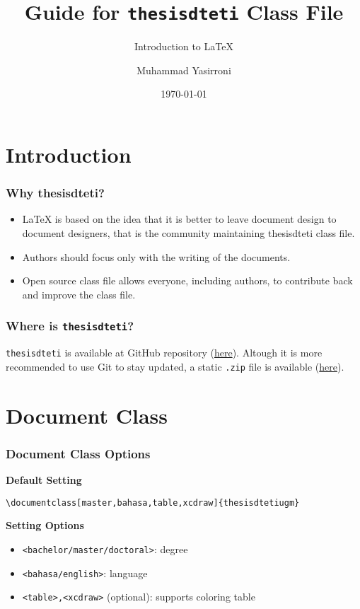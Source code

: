 \documentclass{beamer}
\title{Guide for \texttt{thesisdteti} Class File}
\subtitle{Introduction to LaTeX}
\author{Muhammad Yasirroni}
\institute{Universitas Gadjah Mada}
\date{\today}
\begin{document}
\begin{frame}
  \titlepage
\end{frame}

\section{Introduction}
\begin{frame}
    \frametitle{Why thesisdteti?}
    \begin{itemize}
      \item LaTeX is based on the idea that it is better to leave document design to document designers, that is the community maintaining thesisdteti class file.
      \item Authors should focus only with the writing of the documents.
      \item Open source class file allows everyone, including authors, to contribute back and improve the class file.
    \end{itemize}
\end{frame}

\begin{frame}
  \frametitle{Where is \texttt{thesisdteti}?}
  \texttt{thesisdteti} is available at GitHub repository (\href{https://github.com/yasirroni/thesisdtetiugm}{here}). Altough it is more recommended to use Git to stay updated, a static \texttt{.zip} file is available (\href{https://github.com/yasirroni/thesisdtetiugm/archive/refs/heads/master.zip}{here}).
\end{frame}

\section{Document Class}

\begin{frame}[fragile]
  \frametitle{Document Class Options}

  \textbf{Default Setting}

  \begin{block}{}
    \vspace{-2em}
    \small
    \begin{verbatim}
\documentclass[master,bahasa,table,xcdraw]{thesisdtetiugm}
    \end{verbatim}
  \end{block}

  \textbf{Setting Options}

  \begin{itemize}
    \item \texttt{<bachelor/master/doctoral>}: degree
    \item \texttt{<bahasa/english>}: language
    \item \texttt{<table>,<xcdraw>} (optional): supports coloring table
  \end{itemize}

\end{frame}
\end{document}
